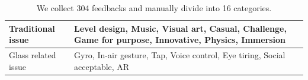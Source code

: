  \begin{table}[!h]
\newcommand{\tabincell}[2]{\begin{tabular}{@{}#1@{}}#2\end{tabular}}
   \centering
   \begin{tabular}{|p{}|p{}|}
     \hline
     \multicolumn{1}{|p{0.3\columnwidth}|}{Traditional issue} &
     \multicolumn{1}{|p{0.5\columnwidth}|}{Level design, Music, Visual art, Casual, Challenge, Game for purpose, Innovative, Physics, Immersion} \\
     \hline
     \multicolumn{1}{|p{0.3\columnwidth}|}{Glass related issue} & 
     \multicolumn{1}{|p{0.5\columnwidth}|}{Gyro, In-air gesture, Tap, Voice control, Eye tiring, Social acceptable, AR} \\
     \hline
   \end{tabular}
   \caption{We collect 304 feedbacks and manually divide into 16 categories.}
   \label{tab:issueType}
 \end{table}


